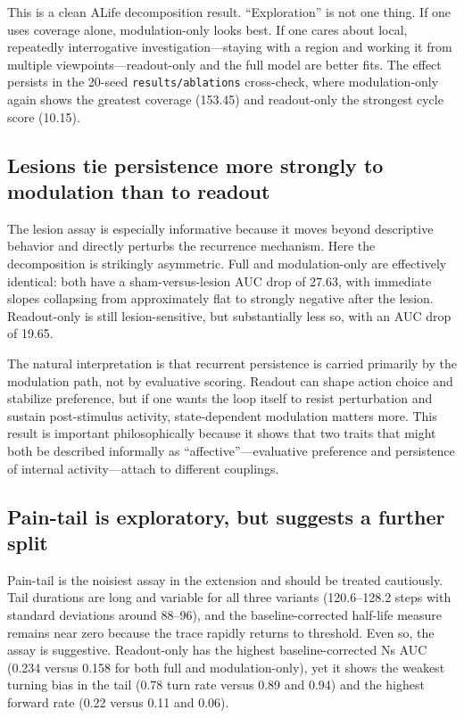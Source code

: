 \documentclass[letterpaper]{article}
\begin{document}
This is a clean ALife decomposition result. ``Exploration'' is not one thing. If one uses coverage alone, modulation-only looks best. If one cares about local, repeatedly interrogative investigation---staying with a region and working it from multiple viewpoints---readout-only and the full model are better fits. The effect persists in the 20-seed \texttt{results/ablations} cross-check, where modulation-only again shows the greatest coverage (153.45) and readout-only the strongest cycle score (10.15).

\subsection{Lesions tie persistence more strongly to modulation than to readout}
The lesion assay is especially informative because it moves beyond descriptive behavior and directly perturbs the recurrence mechanism. Here the decomposition is strikingly asymmetric. Full and modulation-only are effectively identical: both have a sham-versus-lesion AUC drop of 27.63, with immediate slopes collapsing from approximately flat to strongly negative after the lesion. Readout-only is still lesion-sensitive, but substantially less so, with an AUC drop of 19.65.

The natural interpretation is that recurrent persistence is carried primarily by the modulation path, not by evaluative scoring. Readout can shape action choice and stabilize preference, but if one wants the loop itself to resist perturbation and sustain post-stimulus activity, state-dependent modulation matters more. This result is important philosophically because it shows that two traits that might both be described informally as ``affective''---evaluative preference and persistence of internal activity---attach to different couplings.

\subsection{Pain-tail is exploratory, but suggests a further split}
Pain-tail is the noisiest assay in the extension and should be treated cautiously. Tail durations are long and variable for all three variants (120.6--128.2 steps with standard deviations around 88--96), and the baseline-corrected half-life measure remains near zero because the trace rapidly returns to threshold. Even so, the assay is suggestive. Readout-only has the highest baseline-corrected Ns AUC (0.234 versus 0.158 for both full and modulation-only), yet it shows the weakest turning bias in the tail (0.78 turn rate versus 0.89 and 0.94) and the highest forward rate (0.22 versus 0.11 and 0.06).
\end{document}
